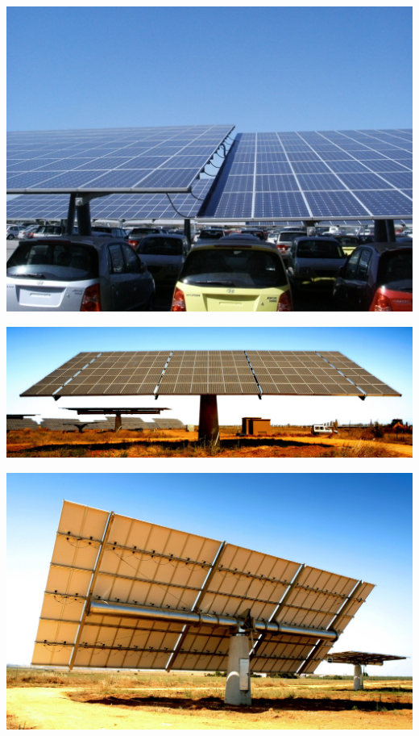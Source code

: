 \documentclass[xcolor={usenames,svgnames,dvipsnames}]{beamer}
\begin{document}
\begin{frame}[label={sec:orgb29f62e}]{}
\begin{center}
\includegraphics[width=.9\linewidth]{../figs/dscf0997.jpg}
\end{center}
\end{frame}

\begin{frame}[label={sec:org1ef872e}]{}
\begin{center}
\includegraphics[height=0.35\textheight]{../figs/carmona.JPG}
\end{center}

\begin{center}
\includegraphics[width=.9\linewidth]{../figs/carmona_detras.JPG}
\end{center}
\end{frame}
\end{document}
